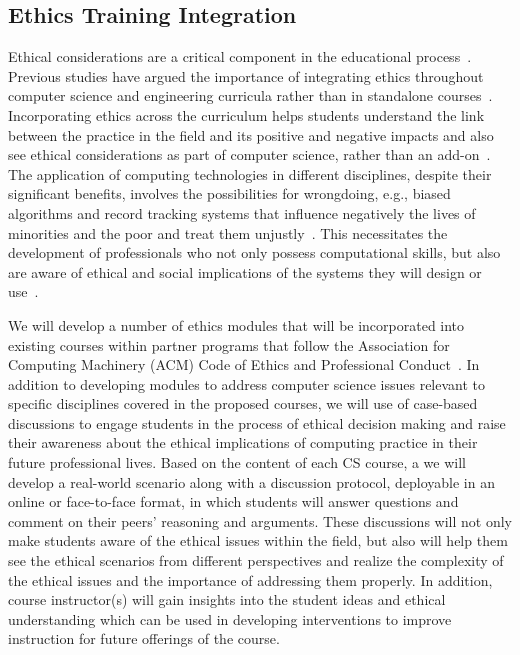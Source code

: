 
\subsection{Ethics Training Integration}
Ethical considerations are a critical component in the educational process~\cite{stahl}. Previous studies have argued the importance of integrating ethics throughout computer science and engineering curricula rather than in standalone courses~\cite{newberry,yale-weltz}. Incorporating ethics across the curriculum helps students understand the link between the practice in the field and its positive and negative impacts and also see ethical considerations as part of computer science, rather than an add-on~\cite{newberry, pantazidou, yale-weltz}. The application of computing technologies in different disciplines, despite their significant benefits, involves the possibilities for wrongdoing, e.g., biased algorithms and record tracking systems that influence negatively the lives of minorities and the poor and treat them unjustly~\cite{oneil}. This necessitates the development of professionals who not only possess computational skills, but also are aware of ethical and social implications of the systems they will design or use~\cite{connolly,stahl}.

We will develop a number of ethics modules that will be incorporated into existing courses within partner programs that follow the Association for Computing Machinery (ACM) Code of Ethics and Professional Conduct~\cite{acm-ethics}. In addition to developing modules to address computer science issues relevant to specific disciplines covered in the proposed courses, we will use of case-based discussions to engage students in the process of ethical decision making and raise their awareness about the ethical implications of computing practice in their future professional lives. Based on the content of each CS course, a we will develop a real-world scenario along with a discussion protocol, deployable in an online or face-to-face format, in which students will answer questions and comment on their peers’ reasoning and arguments. These discussions will not only make students aware of the ethical issues within the field, but also will help them see the ethical scenarios from different perspectives and  realize the complexity of the ethical issues and the importance of addressing them properly. In addition, course instructor(s) will gain insights into the student ideas and ethical understanding which can be used in developing interventions to improve instruction for future offerings of the course.

